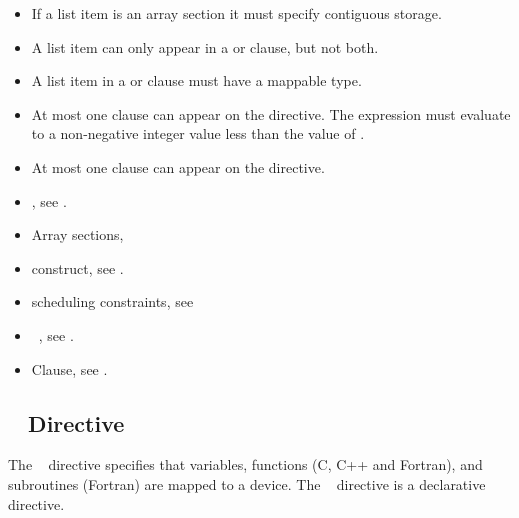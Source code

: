 {{{{\begin{itemize}
\item If a list item is an array section it must specify contiguous storage. 

\item A list item can only appear in a  or  clause, but not both.

\item A list item in a  or  clause must have a mappable type.

\item At most one  clause can appear on the directive. The  expression
      must evaluate to a non-negative integer value less than the value
      of .

\item At most one  clause can appear on the directive. 
\end{itemize}

\crossreferences
\begin{itemize}
\item {}, see 
.

\item Array sections, 

\item {} construct, see 
.

\item {} scheduling constraints, see 

\item {}~, see 
. 

\item {} Clause, see .


\end{itemize}










\subsection{~ Directive}
\label{subsec:declare target Directive}
\summary
The ~ directive specifies that variables, 
functions (C, C++ and Fortran), and subroutines (Fortran) are mapped 
to a device. The ~ directive is a declarative 
directive.

}}}}
